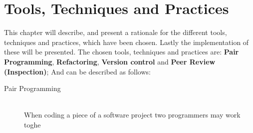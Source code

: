 
\chapter{Tools, Techniques and Practices} %
\label{cha:tools_techniques_and_practices}
This chapter will describe, and present a rationale for the different tools, techniques and practices, which have been chosen.
Lastly the implementation of these will be presented.
The chosen tools, techniques and practices are: \textbf{Pair Programming}, \textbf{Refactoring}, \textbf{Version control} and \textbf{Peer Review (Inspection)}; And can be described as follows:
\begin{description}
    \item[Pair Programming]\hfill\\
    When coding a piece of a software project two programmers may work toghe
\end{description}

